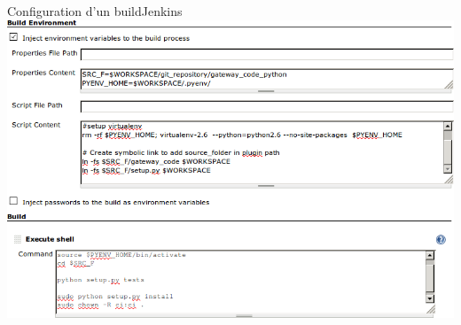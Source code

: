 \documentclass[9pt]{beamer}
\begin{document}
\begin{frame}{Configuration d'un build}{Jenkins}
  \includegraphics[width=\linewidth]{images/build_configuration}
\end{frame}
\end{document}
